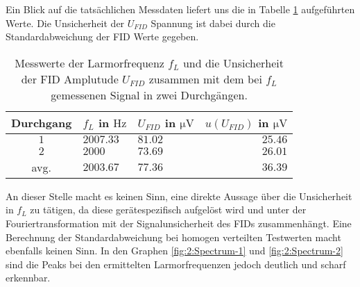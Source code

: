 \documentclass{article}
\begin{document}
    Ein Blick auf die tatsächlichen Messdaten liefert uns die in Tabelle \ref{tab:2:Larmor_Freq} aufgeführten Werte. Die Unsicherheit der $U_{\textit{FID}}$ Spannung ist dabei durch die Standardabweichung der FID Werte gegeben.
    \begin{table}[H]
        \centering
        \begin{tabular}{c|l|l|r}
            \textbf{Durchgang} & $f_L$ in $\si{\hertz}$ & $U_{\textit{FID}}$ in $\si{\micro\volt}$ & $u(U_{\textit{FID}})$ in $\si{\micro\volt}$\\
            \hline
            $1$ & $2007.33$ & $81.02$ & $25.46$\\
            $2$ & $2000$ & $73.69$ & $26.01$ \\
            \hline 
            avg. & $2003.67$ & $77.36$ & $36.39$
        \end{tabular}
        \caption{Messwerte der Larmorfrequenz $f_L$ und die Unsicherheit der FID Amplutude $U_{\textit{FID}}$ zusammen mit dem bei $f_L$ gemessenen Signal in zwei Durchgängen.}
        \label{tab:2:Larmor_Freq}
    \end{table}
    An dieser Stelle macht es keinen Sinn, eine direkte Aussage über die Unsicherheit in $f_L$ zu tätigen, da diese gerätespezifisch aufgelöst wird und unter der Fouriertransformation mit der Signalunsicherheit des FIDs zusammenhängt. Eine Berechnung der Standardabweichung bei homogen verteilten Testwerten macht ebenfalls keinen Sinn. In den Graphen \ref{fig:2:Spectrum-1} und \ref{fig:2:Spectrum-2} sind die Peaks bei den ermittelten Larmorfrequenzen jedoch deutlich und scharf erkennbar.
    
\end{document}
